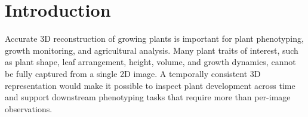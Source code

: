 \documentclass[sigconf]{acmart}
\begin{document}



\section{Introduction}
Accurate 3D reconstruction of growing plants is important for plant phenotyping, growth monitoring, and agricultural analysis. Many plant traits of interest, such as plant shape, leaf arrangement, height, volume, and growth dynamics, cannot be fully captured from a single 2D image. A temporally consistent 3D representation would make it possible to inspect plant development across time and support downstream phenotyping tasks that require more than per-image observations.
\end{document}
